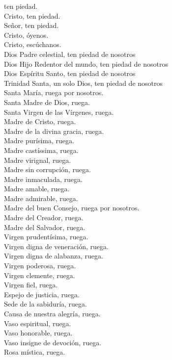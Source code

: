 ten piedad.\\
Cristo, ten piedad.\\
Señor, ten piedad.\\
Cristo, óyenos.\\
Cristo, escúchanos.\\
Dios Padre celestial, ten piedad de nosotros\\
Dios Hijo Redentor del mundo, ten piedad de nosotros\\
Dios Espíritu Santo, ten piedad de nosotros\\
Trinidad Santa, un solo Dios, ten piedad de nosotros\\
Santa María, ruega por nosotros.\\
Santa Madre de Dios, ruega.\\
Santa Virgen de las Vírgenes, ruega.\\
Madre de Cristo, ruega.\\
Madre de la divina gracia, ruega.\\
Madre purísima, ruega.\\
Madre castíssima, ruega.\\
Madre virignal, ruega.\\
Madre sin corrupción, ruega.\\
Madre inmaculada, ruega.\\
Madre amable, ruega.\\
Madre admirable, ruega.\\
Madre del buen Consejo, ruega por nosotros.\\
Madre del Creador, ruega.\\
Madre del Salvador, ruega.\\
Virgen prudentísima, ruega.\\
Virgen digna de veneración, ruega.\\
Virgen digna de alabanza, ruega.\\
Virgen poderosa, ruega.\\
Virgen clemente, ruega.\\
Virgen fiel, ruega.\\
Espejo de justicia, ruega.\\
Sede de la sabiduría, ruega.\\
Causa de nuestra alegría, ruega.\\
Vaso espiritual, ruega.\\
Vaso honorable, ruega.\\
Vaso insigne de devoción, ruega.\\
Rosa mística, ruega.\\

